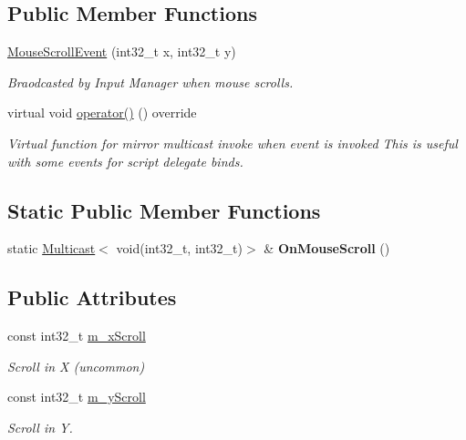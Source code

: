 \subsection*{Public Member Functions}
\begin{DoxyCompactItemize}
\item 
\hyperlink{classMouseScrollEvent_a69075c1ddb225629b22f2429e935f055}{Mouse\+Scroll\+Event} (int32\+\_\+t x, int32\+\_\+t y)
\begin{DoxyCompactList}\small\item\em Braodcasted by Input Manager when mouse scrolls. \end{DoxyCompactList}\item 
\mbox{\label{classMouseScrollEvent_a4b4ffccb70bf75327aa323f6c1fd7d20}} 
virtual void \hyperlink{classMouseScrollEvent_a4b4ffccb70bf75327aa323f6c1fd7d20}{operator()} () override
\begin{DoxyCompactList}\small\item\em Virtual function for mirror multicast invoke when event is invoked This is useful with some events for script delegate binds. \end{DoxyCompactList}\end{DoxyCompactItemize}
\subsection*{Static Public Member Functions}
\begin{DoxyCompactItemize}
\item 
\mbox{\label{classMouseScrollEvent_a74a71de042b6cf675357dd2ae3a11ea2}} 
static \hyperlink{classMulticast}{Multicast}$<$ void(int32\+\_\+t, int32\+\_\+t)$>$ \& {\bfseries On\+Mouse\+Scroll} ()
\end{DoxyCompactItemize}
\subsection*{Public Attributes}
\begin{DoxyCompactItemize}
\item 
\mbox{\label{classMouseScrollEvent_a437a897d17ef4f63e8dc94f979e26719}} 
const int32\+\_\+t \hyperlink{classMouseScrollEvent_a437a897d17ef4f63e8dc94f979e26719}{m\+\_\+x\+Scroll}
\begin{DoxyCompactList}\small\item\em Scroll in X (uncommon) \end{DoxyCompactList}\item 
\mbox{\label{classMouseScrollEvent_a6829041c95140a2affa889fbd471ba5b}} 
const int32\+\_\+t \hyperlink{classMouseScrollEvent_a6829041c95140a2affa889fbd471ba5b}{m\+\_\+y\+Scroll}
\begin{DoxyCompactList}\small\item\em Scroll in Y. \end{DoxyCompactList}\end{DoxyCompactItemize}
